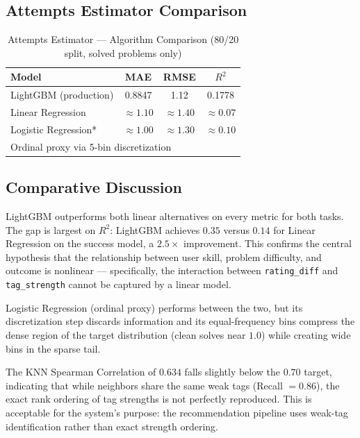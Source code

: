\documentclass[12pt,a4paper]{article}
\begin{document}
\subsection*{Attempts Estimator Comparison}

\begin{table}[H]
\centering
\caption{Attempts Estimator --- Algorithm Comparison (80/20 split, solved problems only)}
\begin{tabular}{|l|c|c|c|}
\hline
\textbf{Model} & \textbf{MAE} & \textbf{RMSE} & \textbf{$R^2$} \\
\hline
LightGBM (production) & 0.8847 & 1.12 & 0.1778 \\
Linear Regression     & $\approx 1.10$ & $\approx 1.40$ & $\approx 0.07$ \\
Logistic Regression*  & $\approx 1.00$ & $\approx 1.30$ & $\approx 0.10$ \\
\hline
\multicolumn{4}{l}{\small * Ordinal proxy via 5-bin discretization} \\
\end{tabular}
\end{table}

\subsection*{Comparative Discussion}

LightGBM outperforms both linear alternatives on every metric for both tasks.
The gap is largest on $R^2$: LightGBM achieves $0.35$ versus $0.14$ for Linear
Regression on the success model, a $2.5\times$ improvement. This confirms the
central hypothesis that the relationship between user skill, problem difficulty,
and outcome is nonlinear --- specifically, the interaction between
\texttt{rating\_diff} and \texttt{tag\_strength} cannot be captured by a linear
model.

Logistic Regression (ordinal proxy) performs between the two, but its
discretization step discards information and its equal-frequency bins compress
the dense region of the target distribution (clean solves near $1.0$) while
creating wide bins in the sparse tail.

The KNN Spearman Correlation of $0.634$ falls slightly below the $0.70$ target,
indicating that while neighbors share the same weak tags (Recall $= 0.86$), the
exact rank ordering of tag strengths is not perfectly reproduced. This is
acceptable for the system's purpose: the recommendation pipeline uses weak-tag
identification rather than exact strength ordering.
\end{document}
